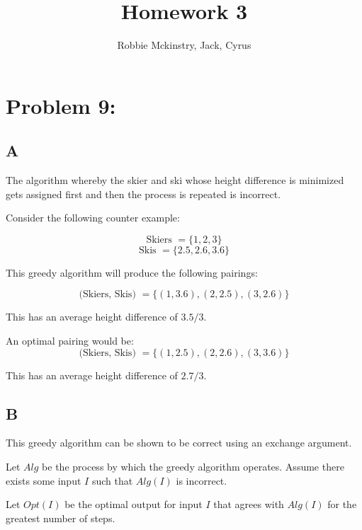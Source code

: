 \documentclass[12pt]{article}
\begin{document}
\title{Homework 3}
\author{Robbie Mckinstry, Jack, Cyrus}
\renewcommand{\today}{4 September 2016}
\renewcommand{\baselinestretch}{1.5}

\maketitle

\section*{Problem 9:}
\subsection*{A}

The algorithm whereby the skier and ski whose height difference
is minimized gets assigned first and then the process is repeated
is incorrect.


Consider the following counter example:

\[
\text{Skiers } = \{1,2,3\}
\]
\[
\text{Skis } = \{2.5, 2.6, 3.6\}
\]

This greedy algorithm will produce the following pairings:

\[
\text{(Skiers, Skis) } = \{(1,3.6),(2,2.5),(3,2.6)\}
\]

This has an average height difference of $3.5/3$.

An optimal pairing would be:
\[
\text{(Skiers, Skis) } = \{(1,2.5),(2,2.6),(3,3.6)\}
\]

This has an average height difference of $2.7/3$.

\subsection*{B}
This greedy algorithm can be shown to be correct using an
exchange argument.

Let $Alg$ be the process by which the greedy algorithm operates.
Assume there exists some input $I$ such that $Alg(I)$ is incorrect.

Let $Opt(I)$ be the optimal output for input $I$ that agrees with
$Alg(I)$ for the greatest number of steps.
\end{document}
